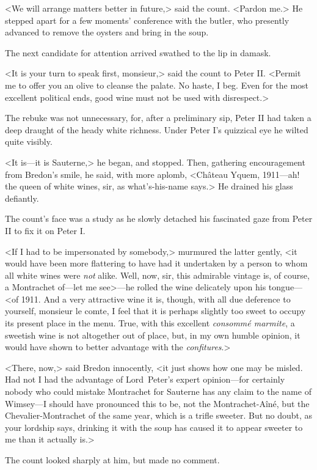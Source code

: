 <We will arrange matters better in future,> said the count. <Pardon me.> He stepped apart for a few moments' conference with the butler, who presently advanced to remove the oysters and bring in the soup.

The next candidate for attention arrived swathed to the lip in damask.

<It is your turn to speak first, monsieur,> said the count to Peter II. <Permit me to offer you an olive to cleanse the palate. No haste, I beg. Even for the most excellent political ends, good wine must not be used with disrespect.>

The rebuke was not unnecessary, for, after a preliminary sip, Peter II had taken a deep draught of the heady white richness. Under Peter I's quizzical eye he wilted quite visibly.

<It is—it is Sauterne,> he began, and stopped. Then, gathering encouragement from Bredon's smile, he said, with more aplomb, <Château Yquem, 1911—ah! the queen of white wines, sir, as what's-his-name says.> He drained his glass defiantly.

The count's face was a study as he slowly detached his fascinated gaze from Peter II to fix it on Peter I.

<If I had to be impersonated by somebody,> murmured the latter gently, <it would have been more flattering to have had it undertaken by a person to whom all white wines were \textit{not} alike. Well, now, sir, this admirable vintage is, of course, a Montrachet of—let me see>—he rolled the wine delicately upon his tongue—<of 1911. And a very attractive wine it is, though, with all due deference to yourself, monsieur le comte, I feel that it is perhaps slightly too sweet to occupy its present place in the menu. True, with this excellent \textit{consommé marmite}, a sweetish wine is not altogether out of place, but, in my own humble opinion, it would have shown to better advantage with the \textit{confitures}.>

<There, now,> said Bredon innocently, <it just shows how one may be misled. Had not I had the advantage of Lord~Peter's expert opinion—for certainly nobody who could mistake Montrachet for Sauterne has any claim to the name of Wimsey—I should have pronounced this to be, not the Montrachet-Aîné, but the Chevalier-Montrachet of the same year, which is a trifle sweeter. But no doubt, as your lordship says, drinking it with the soup has caused it to appear sweeter to me than it actually is.>

The count looked sharply at him, but made no comment.

